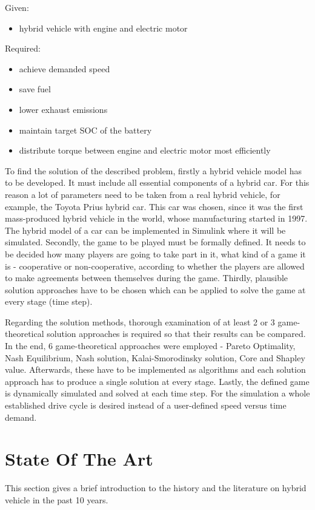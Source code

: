Given:
\begin{itemize}
\item hybrid vehicle with engine and electric motor
\end{itemize}

Required: 
\begin{itemize}
\item achieve demanded speed
\item save fuel
\item lower exhaust emissions
\item maintain target SOC of the battery
\item distribute torque between engine and electric motor most efficiently
\end{itemize}

To find the solution of the described problem, firstly a hybrid vehicle model has to be developed. It must include all essential components of a hybrid car. For this reason a lot of parameters need to be taken from a real hybrid vehicle, for example, the Toyota Prius hybrid car. This car was chosen, since it was the first mass-produced hybrid vehicle in the world, whose manufacturing started in 1997. The hybrid model of a car can be implemented in Simulink where it will be simulated. Secondly, the game to be played must be formally defined. It needs to be decided how many players are going to take part in it, what kind of a game it is - cooperative or non-cooperative, according to whether the players are allowed to make agreements between themselves during the game. Thirdly, plausible solution approaches have to be chosen which can be applied to solve the game at every stage (time step). 

Regarding the solution methods, thorough examination of at least 2 or 3 game-theoretical solution approaches is required so that their results can be compared. In the end, 6 game-theoretical approaches were employed - Pareto Optimality, Nash Equilibrium, Nash solution, Kalai-Smorodinsky solution, Core and Shapley value. Afterwards, these have to be implemented as algorithms and each solution approach has to produce a single solution at every stage. Lastly, the defined game is dynamically simulated and solved at each time step. For the simulation a whole established drive cycle is desired instead of a user-defined speed versus time demand.


\section{State Of The Art} 
\label{sec:stateart}
This section gives a brief introduction to the history and the literature on hybrid vehicle in the past 10 years.

